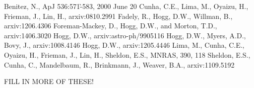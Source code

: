 \documentclass[12pt, onecolumn]{emulateapj}
\begin{document}
\begin{thebibliography}{}
Benitez, N., ApJ 536:571-̀583, 2000 June 20
Cunha, C.E., Lima, M., Oyaizu, H., Frieman, J., Lin, H., arxiv:0810.2991
Fadely, R., Hogg, D.W., Willman, B., arxiv:1206.4306
Foreman-Mackey, D., Hogg, D.W., and Morton, T.D., arxiv:1406.3020
Hogg, D.W., arxiv:astro-ph/9905116
Hogg, D.W., Myers, A.D., Bovy, J., arxiv:1008.4146
Hogg, D.W., arxiv:1205.4446
Lima, M., Cunha, C.E., Oyaizu, H., Frieman, J., Lin, H., Sheldon, E.S., MNRAS, 390, 118
Sheldon, E.S., Cunha, C., Mandelbaum, R., Brinkmann, J., Weaver, B.A., arxiv:1109.5192

FILL IN MORE OF THESE!
\end{thebibliography}
\end{document}

